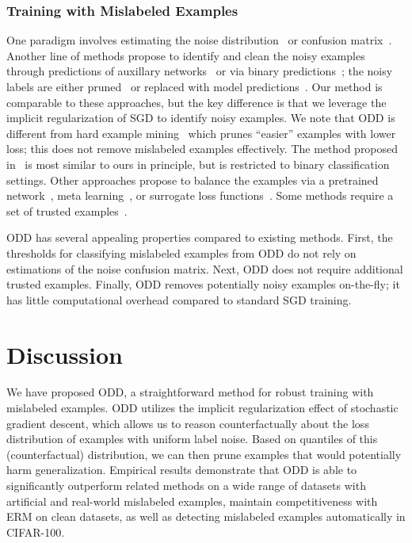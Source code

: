 \documentclass[a4paper,11pt]{article}
\begin{document}
\subsubsection{Training with Mislabeled Examples} One paradigm involves estimating the noise distribution~\cite{liu2014classification} or confusion matrix~\cite{sukhbaatar2014training}. 
Another line of methods propose to identify and clean the noisy examples~\cite{cretu2008casting} through predictions of auxillary networks~\cite{veit2017learning,patrini2017making} or via binary predictions~\cite{northcutt2017learning}; the noisy labels are either pruned~\cite{brodley1996identifying} or replaced with model predictions~\cite{reed2014training}. 
Our method is comparable to these approaches, but the key difference is that we leverage the implicit regularization of SGD to identify noisy examples. We note that \textsc{ODD} is different from hard example mining~\cite{shrivastava2016training} which prunes ``easier'' examples with lower loss; this does not remove mislabeled examples effectively. The method proposed in~\cite{northcutt2017learning} is most similar to ours in principle, but is restricted to binary classification settings.
Other approaches propose to balance the examples via a pretrained network~\cite{jiang2017mentornet}, meta learning~\cite{ren2018learning}, or surrogate loss functions~\cite{ghosh2017robust,zhang2018generalized,tanaka2018joint}. Some methods require a set of trusted examples~\cite{xiao2015learning,hendrycks2018using}. 

\textsc{ODD} has several appealing properties compared to existing methods. First, the thresholds for classifying mislabeled examples from \textsc{ODD} do not rely on estimations of the noise confusion matrix. Next, \textsc{ODD} does not require additional trusted examples. Finally, \textsc{ODD} removes potentially noisy examples on-the-fly; it has little computational overhead compared to standard SGD training. \section{Discussion}
We have proposed \textsc{ODD}, a straightforward method for robust training with mislabeled examples. \textsc{ODD} utilizes the implicit regularization effect of stochastic gradient descent, which allows us to reason counterfactually about the loss distribution of examples with uniform label noise. Based on quantiles of this (counterfactual) distribution, we can then prune examples that would potentially harm generalization.
Empirical results demonstrate that \textsc{ODD} is able to significantly outperform related methods on a wide range of datasets with artificial and real-world mislabeled examples, maintain competitiveness with \textsc{ERM} on clean datasets, as well as detecting mislabeled examples automatically in CIFAR-100. 
\end{document}
